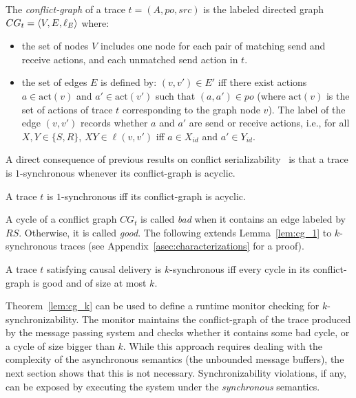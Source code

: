 
\begin{definition}\label{def:conf_graph}
    The \emph{conflict-graph} of a trace $t=(A,po,src)$ is the labeled directed graph $CG_t=\left\langle {V,E,\ell_E} \right\rangle$ where:
\begin{itemize}
	\item the set of nodes $V$ includes one node for each pair of matching send and receive actions, and each unmatched send action in $t$. 
    	\item the set of edges $E$ is defined by: $(v,v') \in E'$ iff there exist actions $a \in \mathrm{act}(v)$ and $a' \in \mathrm{act}(v')$ such that $(a,a') \in po$ (where $\mathrm{act}(v)$ is the set of actions of trace $t$ corresponding to the graph node $v$). The label of the edge $(v,v')$ records whether $a$ and $a'$ are send or receive actions, i.e., for all $X,Y\in \{S,R\}$, $XY\in \ell(v,v')$ iff $a\in X_{id}$ and $a'\in Y_{id}$.
\end{itemize}
\end{definition}

A direct consequence of previous results on conflict serializability~\cite{journals/jacm/Papadimitriou79b} is that 
a trace is $1$-synchronous whenever its conflict-graph is acyclic.

\begin{lemma}\label{lem:cg_1}
A trace $t$ is $1$-synchronous if{f} its conflict-graph is acyclic.
\end{lemma}

A cycle of a conflict graph $CG_t$ is called \emph{bad} when it contains %
an edge labeled by $RS$.
Otherwise, it is called \emph{good}.
The following extends Lemma~\ref{lem:cg_1} to $k$-synchronous traces (see Appendix~\ref{asec:characterizations} for a proof).


\begin{theorem}\label{lem:cg_k}
A trace $t$ satisfying causal delivery is $k$-synchronous if{f} every cycle in its conflict-graph is good and of size at most $k$.
\end{theorem}

Theorem~\ref{lem:cg_k} can be used to define a runtime monitor checking for $k$-synchronizability. 
The monitor maintains the conflict-graph of the trace produced by the message passing system and checks whether it contains some bad cycle, or a cycle of size bigger than $k$.
While this approach requires dealing with the complexity of the asynchronous semantics (the unbounded message buffers), the next section shows that this is not necessary. Synchronizability violations, if any, can be exposed by executing the system under the \emph{synchronous} semantics.




